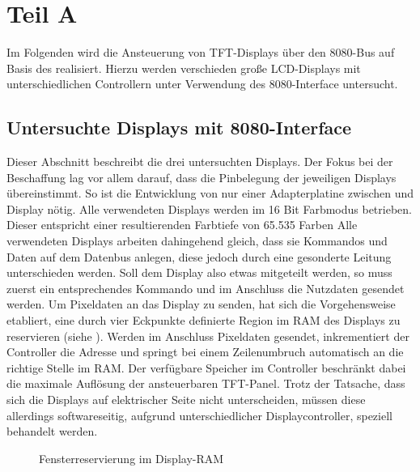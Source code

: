 	\chapter{Teil A}
Im Folgenden wird die Ansteuerung von TFT-Displays über den 8080-Bus auf Basis des  realisiert. Hierzu werden verschieden große LCD-Displays mit unterschiedlichen Controllern unter Verwendung des 8080-Interface untersucht. 

\section{Untersuchte Displays mit 8080-Interface}
Dieser Abschnitt beschreibt die drei untersuchten Displays. Der Fokus bei der Beschaffung lag vor allem darauf, dass die Pinbelegung der jeweiligen Displays übereinstimmt. So ist die Entwicklung von nur einer Adapterplatine zwischen  und Display nötig. Alle verwendeten Displays werden im 16 Bit Farbmodus betrieben. Dieser entspricht einer resultierenden Farbtiefe von 65.535 Farben\newline %
Alle verwendeten Displays arbeiten dahingehend gleich, dass sie Kommandos und Daten auf dem Datenbus anlegen, diese jedoch durch eine gesonderte Leitung unterschieden werden. Soll dem Display also etwas mitgeteilt werden, so muss zuerst ein entsprechendes Kommando und im Anschluss die Nutzdaten gesendet werden. Um Pixeldaten an das Display zu senden, hat sich die Vorgehensweise etabliert, eine durch vier Eckpunkte definierte Region im RAM des Displays zu reservieren (siehe ). Werden im Anschluss Pixeldaten gesendet, inkrementiert der Controller die Adresse und springt bei einem Zeilenumbruch automatisch an die richtige Stelle im RAM. Der verfügbare Speicher im Controller beschränkt dabei die maximale Auflösung der ansteuerbaren TFT-Panel. Trotz der Tatsache, dass sich die Displays auf elektrischer Seite nicht unterscheiden, müssen diese allerdings softwareseitig, aufgrund unterschiedlicher Displaycontroller, speziell behandelt werden.
\begin{figure}[h]
	\centering
{}
	\caption{Fensterreservierung im Display-RAM}
	\label{fig:ram_window}
\end{figure}
